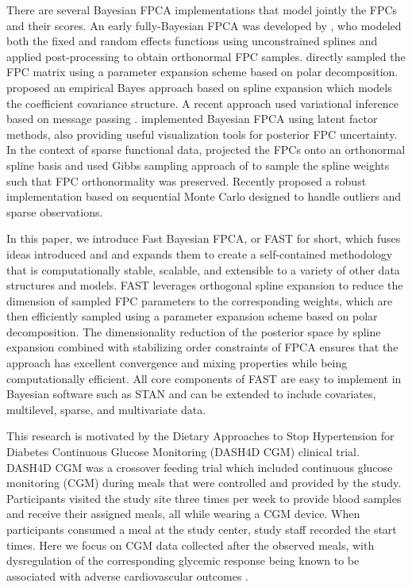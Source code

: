 \documentclass[12pt]{article}
\begin{document}
There are several Bayesian FPCA implementations that model jointly  the FPCs and their scores. An early fully-Bayesian FPCA was developed by \cite{goldsmith_generalized_2015}, who modeled both the fixed and random effects functions using unconstrained splines and applied post-processing to obtain orthonormal FPC samples. \cite{jauch_monte_2021} directly sampled the FPC matrix using a parameter expansion scheme based on polar decomposition. \cite{suarez_bayesian_2017} proposed an empirical Bayes approach based on spline expansion which models the coefficient covariance structure. A recent approach used variational inference based on message passing \citep{nolan_bayesian_2023}. \cite{boland_central_2023} implemented Bayesian FPCA using latent factor methods, also providing useful visualization tools for posterior FPC uncertainty. In the context of sparse functional data, \cite{ye_functional_2024} projected the FPCs onto an orthonormal spline basis and used Gibbs sampling approach of \cite{hoff_simulation_2009} to sample the spline weights such that FPC orthonormality was preserved. Recently \cite{zhang_robust_2025}  proposed a robust implementation based on sequential Monte Carlo designed to handle outliers and sparse observations. 

In this paper, we introduce Fast Bayesian FPCA, or FAST for short, which fuses ideas introduced \cite{ye_functional_2024} and \cite{jauch_monte_2021} and expands them to create a self-contained methodology that is computationally stable, scalable, and extensible to a variety of other data structures and  models. FAST leverages orthogonal spline expansion to reduce the dimension of sampled FPC parameters to the corresponding weights, which are then efficiently sampled using a parameter expansion scheme based on polar decomposition. The dimensionality reduction of the posterior space by spline expansion combined with stabilizing order constraints of FPCA ensures that the approach has excellent convergence and mixing properties while being computationally efficient. All core components of FAST are easy to implement in  Bayesian software such as {\ttfamily STAN} \citep{carpenter_stan_2017} and can be extended to include covariates, multilevel, sparse, and multivariate data.

This research is motivated by the Dietary Approaches to Stop Hypertension for Diabetes Continuous Glucose Monitoring (DASH4D CGM) clinical trial. DASH4D CGM was a crossover feeding trial which included continuous glucose monitoring (CGM) during meals that were controlled and provided by the study. Participants visited the study site three times per week to provide blood samples and receive their assigned meals, all while wearing a CGM device. When participants consumed a meal at the study center, study staff recorded the start times. Here we focus on CGM data collected after the observed meals, with dysregulation of the corresponding glycemic response being known to be associated with adverse cardiovascular outcomes \citep{hershon_importance_2019, garber_postprandial_2012}. 
\end{document}
